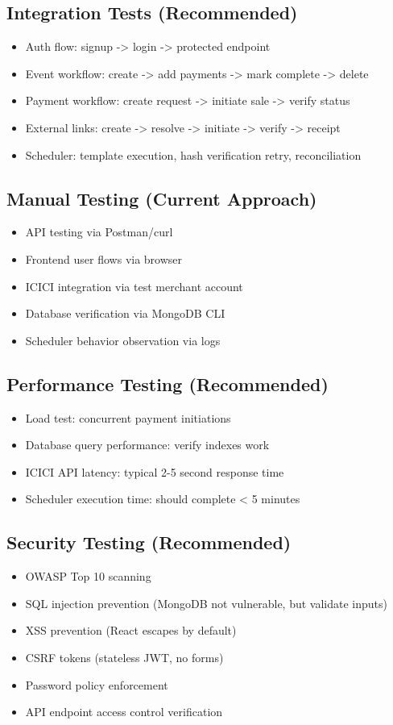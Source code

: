 \documentclass[12pt,a4paper]{article}
\begin{document}
\subsection{Integration Tests (Recommended)}
\begin{itemize}
  \item Auth flow: signup -> login -> protected endpoint
  \item Event workflow: create -> add payments -> mark complete -> delete
  \item Payment workflow: create request -> initiate sale -> verify status
  \item External links: create -> resolve -> initiate -> verify -> receipt
  \item Scheduler: template execution, hash verification retry, reconciliation
\end{itemize}

\subsection{Manual Testing (Current Approach)}
\begin{itemize}
  \item API testing via Postman/curl
  \item Frontend user flows via browser
  \item ICICI integration via test merchant account
  \item Database verification via MongoDB CLI
  \item Scheduler behavior observation via logs
\end{itemize}

\subsection{Performance Testing (Recommended)}
\begin{itemize}
  \item Load test: concurrent payment initiations
  \item Database query performance: verify indexes work
  \item ICICI API latency: typical 2-5 second response time
  \item Scheduler execution time: should complete < 5 minutes
\end{itemize}

\subsection{Security Testing (Recommended)}
\begin{itemize}
  \item OWASP Top 10 scanning
  \item SQL injection prevention (MongoDB not vulnerable, but validate inputs)
  \item XSS prevention (React escapes by default)
  \item CSRF tokens (stateless JWT, no forms)
  \item Password policy enforcement
  \item API endpoint access control verification
\end{itemize}
\end{document}
